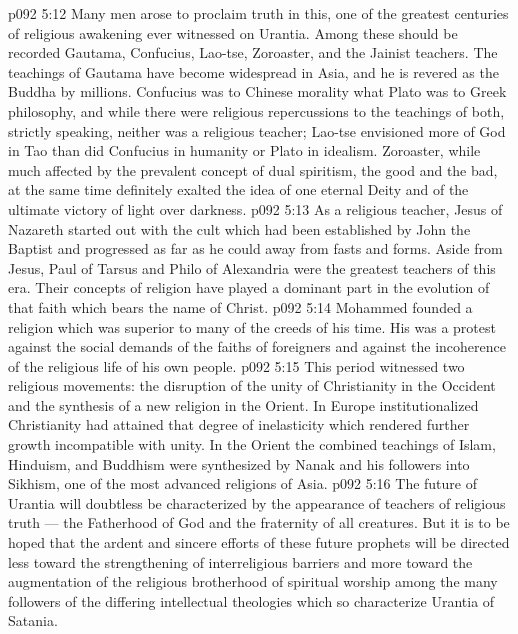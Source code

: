 \vs p092 5:12 \pc {}\bibnobreakspace {} Many men arose to proclaim truth in this, one of the greatest centuries of religious awakening ever witnessed on Urantia. Among these should be recorded Gautama, Confucius, Lao\hyp{}tse, Zoroaster, and the Jainist teachers. The teachings of Gautama have become widespread in Asia, and he is revered as the Buddha by millions. Confucius was to Chinese morality what Plato was to Greek philosophy, and while there were religious repercussions to the teachings of both, strictly speaking, neither was a religious teacher; Lao\hyp{}tse envisioned more of God in Tao than did Confucius in humanity or Plato in idealism. Zoroaster, while much affected by the prevalent concept of dual spiritism, the good and the bad, at the same time definitely exalted the idea of one eternal Deity and of the ultimate victory of light over darkness.
\vs p092 5:13 \pc {}\bibnobreakspace {} As a religious teacher, Jesus of Nazareth started out with the cult which had been established by John the Baptist and progressed as far as he could away from fasts and forms. Aside from Jesus, Paul of Tarsus and Philo of Alexandria were the greatest teachers of this era. Their concepts of religion have played a dominant part in the evolution of that faith which bears the name of Christ.
\vs p092 5:14 \pc {}\bibnobreakspace {} Mohammed founded a religion which was superior to many of the creeds of his time. His was a protest against the social demands of the faiths of foreigners and against the incoherence of the religious life of his own people.
\vs p092 5:15 \pc {}\bibnobreakspace {} This period witnessed two religious movements: the disruption of the unity of Christianity in the Occident and the synthesis of a new religion in the Orient. In Europe institutionalized Christianity had attained that degree of inelasticity which rendered further growth incompatible with unity. In the Orient the combined teachings of Islam, Hinduism, and Buddhism were synthesized by Nanak and his followers into Sikhism, one of the most advanced religions of Asia.
\vs p092 5:16 \pc The future of Urantia will doubtless be characterized by the appearance of teachers of religious truth --- the Fatherhood of God and the fraternity of all creatures. But it is to be hoped that the ardent and sincere efforts of these future prophets will be directed less toward the strengthening of interreligious barriers and more toward the augmentation of the religious brotherhood of spiritual worship among the many followers of the differing intellectual theologies which so characterize Urantia of Satania.
